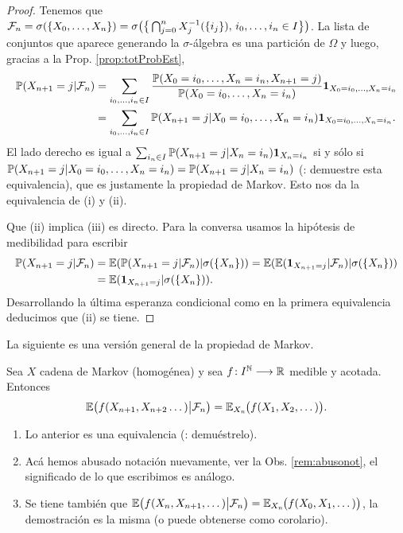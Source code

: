 \begin{proof}
Tenemos que $\mathcal{F}_n=\sigma(\{X_0,\dotsc,X_n\})=\sigma\big(\big\{\bigcap_{j=0}^nX_j^{-1}(\{i_j\}),\,i_0,\dotsc,i_n\in I\big\}\big)$.
La lista de conjuntos que aparece generando la $\sigma$-álgebra es una partición de $\Omega$ y luego, gracias a la Prop. \ref{prop:totProbEst},
\begin{align}
\mathbb{P}(X_{n+1}=j|\mathcal{F}_n)&=\sum_{i_0,\dotsc,i_n\in I}\frac{\mathbb{P}(X_0=i_0,\dotsc,X_n=i_n,X_{n+1}=j)}{\mathbb{P}(X_0=i_0,\dotsc,X_n=i_n)}\mathbf{1}_{X_0=i_0,\dotsc,X_n=i_n}\\
&=\sum_{i_0,\dotsc,i_n\in I}\mathbb{P}(X_{n+1}=j|X_0=i_0,\dotsc,X_n=i_n)\mathbf{1}_{X_0=i_0,\dotsc,X_n=i_n}.
\end{align}
El lado derecho es igual a $\sum_{i_n\in I}\mathbb{P}(X_{n+1}=j|X_n=i_n)\mathbf{1}_{X_n=i_n}$ si y sólo si $\mathbb{P}(X_{n+1}=j|X_0=i_0,\dotsc,X_n=i_n)=\mathbb{P}(X_{n+1}=j|X_n=i_n)$ (\uexers: demuestre esta equivalencia), que es justamente la propiedad de Markov.
Esto nos da la equivalencia de (i) y (ii).

Que (ii) implica (iii) es directo.
Para la conversa usamos la hipótesis de medibilidad para escribir
\begin{align}
\mathbb{P}(X_{n+1}=j|\mathcal{F}_n)&=\mathbb{E}(\mathbb{P}(X_{n+1}=j|\mathcal{F}_n)|\sigma(\{X_n\}))=\mathbb{E}(\mathbb{E}(\mathbf{1}_{X_{n+1}=j}|\mathcal{F}_n)|\sigma(\{X_n\}))\\
&=\mathbb{E}(\mathbf{1}_{X_{n+1}=j}|\sigma(\{X_n\})).
\end{align}
Desarrollando la última esperanza condicional como en la primera equivalencia deducimos que (ii) se tiene.
\end{proof}

La siguiente es una versión general de la propiedad de Markov.

\begin{thm}\label{thm:propMarkGen}
Sea $X$ cadena de Markov (homogénea) y sea $f\!:I^{\mathbb{N}}\longrightarrow\mathbb{R}$ medible y acotada.
Entonces
\[\mathbb{E}\big(f(X_{n+1},X_{n+2}\dotsc)\big|\mathcal{F}_n\big)=\mathbb{E}_{X_n}\hspace{-0.1em}\big(f(X_1,X_2,\dotsc)\big).\]
\end{thm}

\begin{rem}
\leavevmode
\begin{enumerate}[label=(\roman*)]
\item Lo anterior es una equivalencia (\uexers{}: demuéstrelo).
\item Acá hemos abusado notación nuevamente, ver la Obs. \ref{rem:abusonot}, el significado de lo que escribimos es análogo.
\item Se tiene también que $\mathbb{E}\big(f(X_{n},X_{n+1},\dotsc)\big|\mathcal{F}_n\big)=\mathbb{E}_{X_n}\hspace{-0.1em}\big(f(X_0,X_1,\dotsc)\big)$, la demostración es la misma (o puede obtenerse como corolario).
\end{enumerate}
\end{rem}

